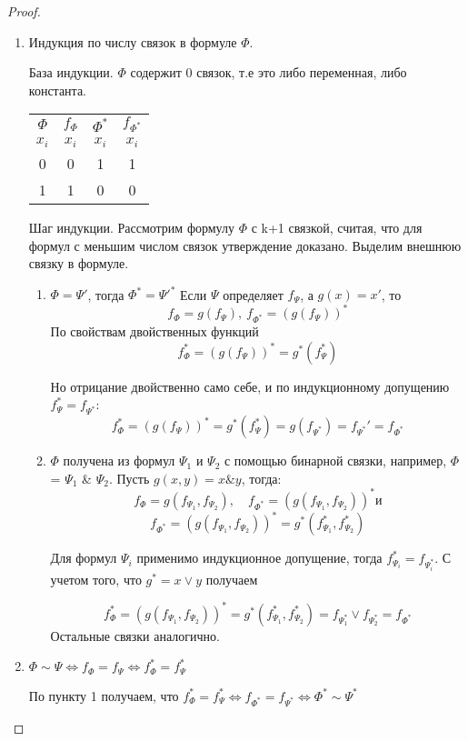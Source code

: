 \documentclass[a4paper]{article}
\theoremstyle{definition}
\theoremstyle{remark}
\begin{document}
    \begin{proof}
        \begin{enumerate}
            \item Индукция по числу связок в формуле $\Phi$.
            
            База индукции. $\Phi$ содержит 0 связок, т.е это либо переменная, либо константа.

            \begin{tabular}{cccc}
                $\Phi$ & $f_\Phi$ & $\Phi^*$ & $f_{\Phi^*}$ \\
                $x_i$ & $x_i$ & $x_i$ & $x_i$ \\
                0 & 0 & 1 & 1 \\
                1 & 1 & 0 & 0 \\
            \end{tabular}

            Шаг индукции. Рассмотрим формулу $\Phi$ с k+1 связкой, считая, что для формул с меньшим числом
            связок утверждение доказано.
            Выделим внешнюю связку в формуле.
            \begin{enumerate}
                \item $\Phi = \Psi'$, тогда $\Phi^* = \Psi'^*$
                Если $\Psi$ определяет $f_\Psi$, а $g(x) = x'$, то $$f_\Phi=g(f_\Psi),\: f_{\Phi^*} = (g(f_\Psi))^*$$
                По свойствам двойственных функций $$f_\Phi^*=(g(f_\Psi))^* = g^*(f_\Psi^*)$$

                Но отрицание двойственно само себе, и по индукционному допущению $f_\Psi^* = f_{\Psi^*}$:
                $$f_\Phi^* = (g(f_\Psi))^* = g^*(f_\Psi^*) = g(f_{\Psi^*}) = f_{\Psi^*}' = f_{\Phi^*}$$
                \item $\Phi$ получена из формул $\Psi_1$ и $\Psi_2$ с помощью бинарной связки,
                например, $\Phi$ = $\Psi_1$ \& $\Psi_2$. Пусть $g(x, y) = x \& y$, тогда:
                $$f_\Phi = g(f_{\Psi_1}, f_{\Psi_2}), \quad f_{\Phi^*} = (g(f_{\Psi_1}, f_{\Psi_2}))^* \text{и}$$
                $$f_{\Phi^*} = (g(f_{\Psi_1}, f_{\Psi_2}))^* = g^*(f_{\Psi_1}^*, f_{\Psi_2}^*)$$

                Для формул $\Psi_i$ применимо индукционное допущение, тогда $f_{\Psi_i}^* = f_{\Psi_i^*}.$ С учетом
                того, что $g^* = x\vee y$ получаем

                $$f_{\Phi}^* = (g(f_{\Psi_1}, f_{\Psi_2}))^*= g^*(f_{\Psi_1}^*, f_{\Psi_2}^*) = f_{\Psi_1^*}\vee f_{\Psi_2^*} = f_{\Phi^*}$$
                Остальные связки аналогично.
            \end{enumerate}
            \item $\Phi \sim \Psi \Leftrightarrow f_\Phi = f_\Psi \Leftrightarrow f_\Phi^* = f_\Psi^*$
            
            По пункту 1 получаем, что $f_\Phi^* = f_\Psi^* \Leftrightarrow f_{\Phi^*} = f_{\Psi^*}\Leftrightarrow \Phi^* \sim \Psi^*$
        \end{enumerate}
    \end{proof}
\end{document}
